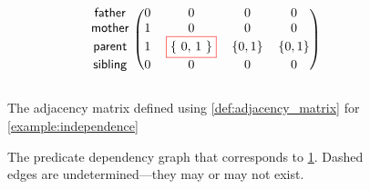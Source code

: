 \documentclass[letterpaper]{article}
\theoremstyle{definition}
\renewcommand\fbox{\fcolorbox{red}{white}}
\begin{document}
\begin{figure}
  \centering
  \[
    \begin{blockarray}{ccccc}
      \begin{block}{c(cccc)}
        \mathsf{father} & 0 & 0 & 0 & 0 \\
        \mathsf{mother} & 1 & 0 & 0 & 0 \\
        \mathsf{parent} & 1 & \fbox{\{ 0, 1 \}} & \{ 0, 1 \} & \{ 0, 1 \} \\
        \mathsf{sibling} & 0 & 0 & 0 & 0 \\
      \end{block}
    \end{blockarray}
  \]
  \caption{The adjacency matrix defined using \cref{def:adjacency_matrix} for
    \cref{example:independence}}
  \label{fig:dependencies_matrix}
\end{figure}
\begin{figure}
  \centering
  \caption{The predicate dependency graph that corresponds to
    \cref{fig:dependencies_matrix}. Dashed edges are undetermined---they may
    or may not exist.}
  \label{fig:dependencies2}
\end{figure}
\end{document}
